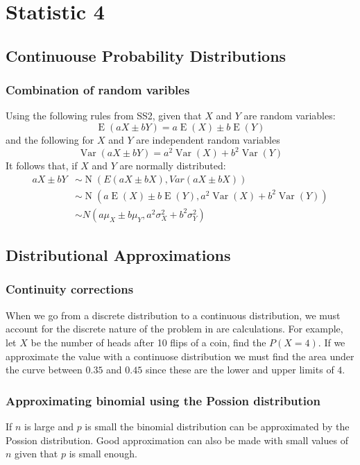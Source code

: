 \chapter{Statistic 4}

\newpage
\section{Continuouse Probability Distributions}

    \newpage
    \subsection{Combination of random varibles}
    Using the following rules from SS2, given that $X$ and $Y$ are random variables:
    $$\operatorname{E}(aX \pm bY) = a\operatorname{E}(X) \pm b\operatorname{E}(Y)$$
    and the following for $X$ and $Y$ are independent random variables
    $$
    \operatorname{Var}(aX \pm bY) = a^2\operatorname{Var}(X) + b^2\operatorname{Var}(Y)
    $$
    It follows that, if $X$ and $Y$ are normally distributed:
    \begin{align*}
    aX \pm bY &\sim \operatorname{N}(E(aX \pm bX), Var(aX \pm bX))\\
    &\sim \operatorname{N}(a\operatorname{E}(X) \pm b\operatorname{E}(Y), a^2\operatorname{Var}(X) + b^2\operatorname{Var}(Y))\\
    &\sim N(a \mu_X \pm b \mu_Y, a^2 \sigma_X^2 + b^2 \sigma_Y^2)
    \end{align*}

\newpage
\section{Distributional Approximations}

    \newpage
    \subsection{Continuity corrections}
        When we go from a discrete distribution to a continuous distribution, we must account for the discrete nature of the problem in are calculations. For example, let $X$ be the number of heads after 10 flips of a coin, find the $P(X = 4)$. If we approximate the value with a continuose distribution we must find the area under the curve between $0.35$ and $0.45$ since these are the lower and upper limits of $4$.

    \newpage
    \subsection{Approximating binomial using the Possion distribution}
        If $n$ is large and $p$ is small the binomial distribution can be approximated by the Possion distribution. Good approximation can also be made with small values of $n$ given that $p$ is small enough.
        
